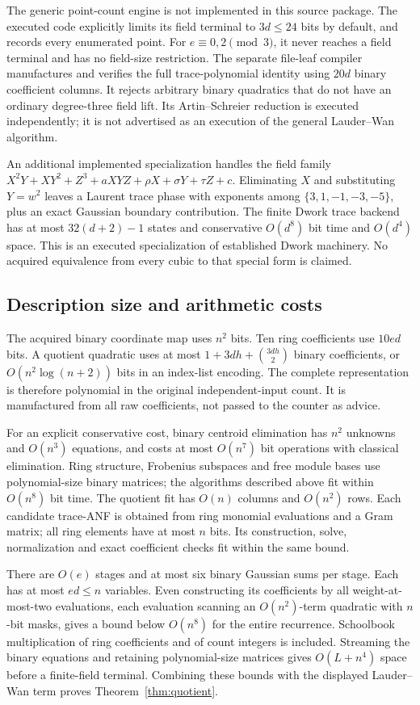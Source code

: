 The generic point-count engine is not implemented in this source package.
The executed code explicitly limits its field terminal to $3d\le24$
bits by default, and records every enumerated point. For
$e\equiv0,2\pmod3$, it never reaches a field terminal and has no
field-size restriction. The separate file-leaf compiler manufactures
and verifies the full trace-polynomial identity using $20d$ binary
coefficient columns. It rejects arbitrary binary quadratics that do
not have an ordinary degree-three field lift. Its Artin--Schreier
reduction is executed independently; it is not advertised as an
execution of the general Lauder--Wan algorithm.

An additional implemented specialization handles the field family
$X^2Y+XY^2+Z^3+aXYZ+\rho X+\sigma Y+\tau Z+c$.
Eliminating $X$ and substituting $Y=w^2$ leaves a Laurent trace phase
with exponents among $\{3,1,-1,-3,-5\}$, plus an exact Gaussian
boundary contribution. The finite Dwork trace backend has at most
$32(d+2)-1$ states and conservative $O(d^8)$ bit time and $O(d^4)$
space. This is an executed specialization of established Dwork machinery.
No acquired equivalence from every cubic to that special form is claimed.

\subsection{Description size and arithmetic costs}
The acquired binary coordinate map uses $n^2$ bits. Ten ring coefficients
use $10ed$ bits. A quotient quadratic uses at most
$1+3dh+\binom{3dh}{2}$ binary coefficients, or $O(n^2\log(n+2))$
bits in an index-list encoding. The complete representation is therefore
polynomial in the original independent-input count. It is manufactured
from all raw coefficients, not passed to the counter as advice.

For an explicit conservative cost, binary centroid elimination has
$n^2$ unknowns and $O(n^3)$ equations, and costs at most $O(n^7)$
bit operations with classical elimination. Ring structure, Frobenius
subspaces and free module bases use polynomial-size binary matrices;
the algorithms described above fit within $O(n^8)$ bit time.
The quotient fit has $O(n)$ columns and $O(n^2)$ rows. Each candidate
trace-ANF is obtained from ring monomial evaluations and a Gram matrix;
all ring elements have at most $n$ bits. Its construction, solve,
normalization and exact coefficient checks fit within the same bound.

There are $O(e)$ stages and at most six binary Gaussian sums per stage.
Each has at most $ed\le n$ variables. Even constructing its coefficients
by all weight-at-most-two evaluations, each evaluation scanning an
$O(n^2)$-term quadratic with $n$-bit masks, gives a bound below $O(n^8)$
for the entire recurrence. Schoolbook multiplication of ring coefficients
and of count integers is included. Streaming the binary equations and
retaining polynomial-size matrices gives $O(L+n^4)$ space before a
finite-field terminal. Combining these bounds with the displayed
Lauder--Wan term proves Theorem~\ref{thm:quotient}.

